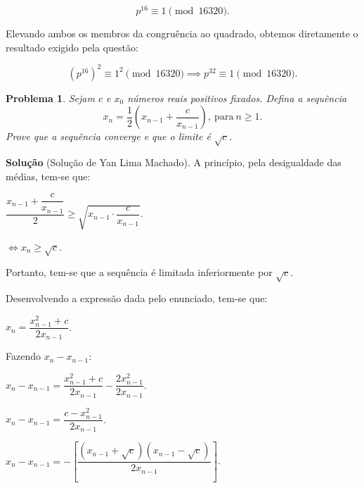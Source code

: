 \documentclass{hipatia}
\newtheorem{problem*}{Problema}
\begin{document}
$$p^{16} \equiv 1 \pmod{16320}.$$

Elevando ambos os membros da congruência ao quadrado, obtemos diretamente o resultado exigido pela questão:

$$(p^{16})^2 \equiv 1^2 \pmod{16320} \implies p^{32} \equiv 1 \pmod{16320}.$$












\begin{problem*} Sejam $c$ e $x_0$ números reais positivos fixados. Defina a sequência $$x_n = \frac{1}{2}\left( x_{n-1} + \frac{c}{x_{n-1}}\right), \ \mbox{para} \ n \geq 1.$$ Prove que a sequência converge e que o limite é $\sqrt{c}$. 
\end{problem*}

\noindent \textbf{Solução} (Solução de Yan Lima Machado). 
A princípio, pela desigualdade das médias, tem-se que:
\vspace*{0.2cm}

\begin{center}
$\dfrac{x_{n-1}+\dfrac{c}{x_{n-1}}}{2}\geq \sqrt{x_{n-1}\cdot \dfrac{c}{x_{n-1}}}$.
\end{center}

\begin{center}
$\Leftrightarrow x_n \geq \sqrt{c}$.
\end{center}

Portanto, tem-se que a sequência é limitada inferiormente por $\sqrt{c}$.

Desenvolvendo a expressão dada pelo enunciado, tem-se que:

\begin{center}
$x_n = \dfrac{x_{n-1}^2 + c}{2x_{n-1}}$.
\end{center}

Fazendo $x_n-x_{n-1}$:
\begin{center}
$x_n-x_{n-1}=\dfrac{x_{n-1}^2+c}{2x_{n-1}}-\dfrac{2x_{n-1}^2}{2x_{n-1}}$. 
\end{center}

\begin{center}
$x_n-x_{n-1}=\dfrac{c-x_{n-1}^2}{2x_{n-1}}$. 
\end{center}

\begin{center}
$x_n-x_{n-1}=-\left[\dfrac{(x_{n-1}+\sqrt{c})(x_{n-1}-\sqrt{c})}{2x_{n-1}}\right]$.
\end{center}
\end{document}
